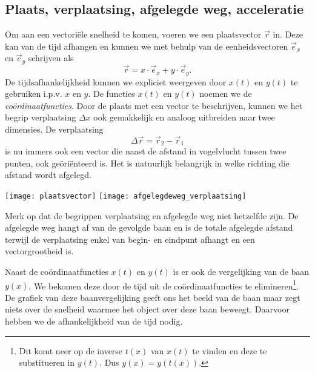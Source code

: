 \documentclass{ximera}
\begin{document}
	\author{Bart Lambregs}
    \xmsource\xmuitleg





	\subsection{Plaats, verplaatsing, afgelegde weg, acceleratie}
	
	Om aan een vectoriële snelheid te komen, voeren we een plaatsvector $\vec{r}$ in. Deze kan van de tijd afhangen en kunnen we met behulp van de eenheidsvectoren $\vec{e}_x$ en $\vec{e}_y$ schrijven als
	\begin{equation*}
	 \vec{r}=x\cdot\vec{e}_x+y\cdot\vec{e}_y.
	\end{equation*}
	De tijdsafhankelijkheid kunnen we expliciet weergeven door $x(t)$ en $y(t)$ te gebruiken i.p.v. $x$ en $y$. De functies $x(t)$ en $y(t)$ noemen we de \emph{coördinaat\-functies}. Door de plaats met een vector te beschrijven, kunnen we het begrip verplaatsing $\Delta x$ ook gemakkelijk en analoog uitbreiden naar twee dimensies. De verplaatsing
	\begin{equation*}
	\Delta\vec{r}=\vec{r}_2-\vec{r}_1
	\end{equation*}
	is nu immers ook een vector die naast de afstand in vogelvlucht tussen twee punten, ook ge\"oriënteerd is. Het is natuurlijk belangrijk in welke richting die afstand wordt afgelegd.
	\begin{image}
	
	\texttt{[image: plaatsvector]}
	\texttt{[image: afgelegdeweg\_verplaatsing]}
	\end{image}
	Merk op dat de begrippen verplaatsing en afgelegde weg niet hetzelfde zijn. De afgelegde weg hangt af van de gevolgde baan en is de totale afgelegde afstand terwijl de verplaatsing enkel van begin- en eindpunt afhangt en een vectorgrootheid is.
	
	Naast de coördinaatfuncties $x(t)$ en $y(t)$ is er ook de vergelijking van de baan $y(x)$. We bekomen deze door de tijd uit de coördinaatfuncties te elimineren\footnote{Dit komt neer op de inverse $t(x)$ van $x(t)$ te vinden en deze te substitueren in $y(t)$. Dus $y(x)=y(t(x))$.}. De grafiek van deze baanvergelijking geeft ons het beeld van de baan maar zegt niets over de snelheid waarmee het object over deze baan beweegt. Daarvoor hebben we de afhankelijkheid van de tijd nodig.
	
\end{document}
